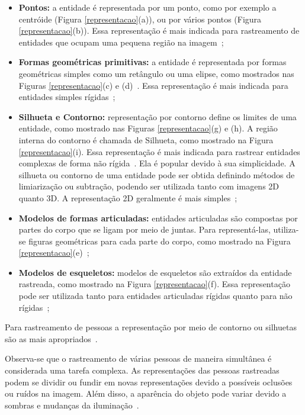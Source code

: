 	\begin{itemize}
		\item \textbf{Pontos:} a entidade é representada por um ponto, como por exemplo a centróide (Figura \ref{representacao}(a)), ou por vários pontos (Figura \ref{representacao}(b)). Essa representação é mais indicada para rastreamento de entidades que ocupam uma pequena região na imagem~\cite{yilmaz};

		\item \textbf{Formas geométricas primitivas:} a entidade é representada por formas geométricas simples como um retângulo ou uma elipse, como mostrados nas Figuras \ref{representacao}(c) e (d)~\cite{comaniciu}. Essa representação é mais indicada para entidades simples rígidas~\cite{yilmaz};

		\item \textbf{Silhueta e Contorno:} representação por contorno define os limites de uma entidade, como mostrado nas Figuras \ref{representacao}(g) e (h). A região interna do contorno é chamada de Silhueta, como mostrado na Figura \ref{representacao}(i). Essa representação é mais indicada para rastrear entidades complexas de forma não rígida~\cite{yilmaz, yilmaz2}. Ela é popular devido à sua simplicidade. A silhueta ou contorno de uma entidade pode ser obtida definindo métodos de limiarização ou subtração, podendo ser utilizada tanto com imagens 2D quanto 3D. A representação 2D geralmente é mais simples~\cite{moeslund};

		\item \textbf{Modelos de formas articuladas:} entidades articuladas são compostas por partes do corpo que se ligam por meio de juntas. Para representá-las, utiliza-se figuras geométricas para cada parte do corpo, como mostrado na Figura \ref{representacao}(e)~\cite{yilmaz};

		\item \textbf{Modelos de esqueletos:} modelos de esqueletos são extraídos da entidade rastreada, como mostrado na Figura \ref{representacao}(f). Essa representação pode ser utilizada tanto para entidades articuladas rígidas quanto para não rígidas~\cite{yilmaz};
	\end{itemize}

	Para rastreamento de pessoas a representação por meio de contorno ou silhuetas são as mais apropriados~\cite{yilmaz}.

	Observa-se que o rastreamento de várias pessoas de maneira simultânea é considerada uma tarefa complexa. As representações das pessoas rastreadas podem se dividir ou fundir em novas representações devido a possíveis oclusões ou ruídos na imagem. Além disso, a aparência do objeto pode variar devido a sombras e mudanças da iluminação~\cite{moeslund}.

